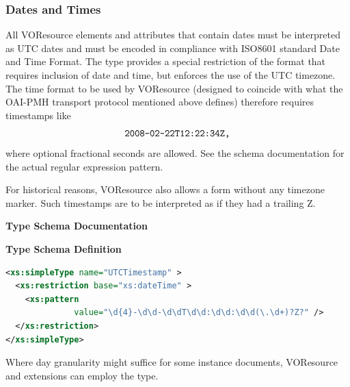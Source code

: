 \documentclass[11pt,a4paper]{ivoa}
\begin{document}
\subsubsection{Dates and Times}

All VOResource elements and attributes that contain dates must be
interpreted as UTC dates and must be encoded in compliance with ISO8601
\citep{std:iso8601}
standard Date and Time Format.  The  type
provides a special restriction of the format that requires inclusion of
date and time, but enforces the use of the UTC timezone.  The time
format to be used by VOResource (designed to coincide with
what the OAI-PMH transport protocol mentioned above defines)
therefore requires timestamps like
$$\hbox{\texttt{2008-02-22T12:22:34Z,}}$$
where optional fractional seconds are allowed.  See the schema
documentation for the actual regular expression pattern.

For historical reasons, VOResource also allows a form without any
timezone marker.  Such timestamps are to be interpreted as  if they had
a trailing Z.

\begin{generated}
\begingroup
      	\renewcommand*\descriptionlabel[1]{%
      	\hbox to 5.5em{\emph{#1}\hfil}}\vspace{2ex}\noindent\textbf{ Type Schema Documentation}


\vspace{1ex}\noindent\textbf{ Type Schema Definition}

\begin{lstlisting}[language=XML,basicstyle=\footnotesize]
<xs:simpleType name="UTCTimestamp" >
  <xs:restriction base="xs:dateTime" >
    <xs:pattern
              value="\d{4}-\d\d-\d\dT\d\d:\d\d:\d\d(\.\d+)?Z?" />
  </xs:restriction>
</xs:simpleType>
\end{lstlisting}\endgroup
\end{generated}



Where day granularity might suffice for some instance documents, 
VOResource and extensions can
employ the  type.
\end{document}
